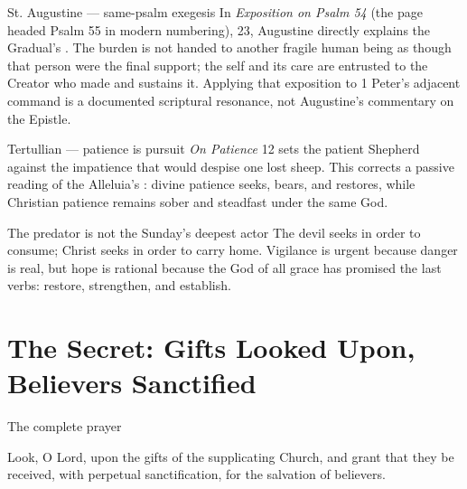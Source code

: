 \begin{deepstudy}
\begin{sourcecard}{St. Augustine --- same-psalm exegesis}
In \emph{Exposition on Psalm 54} (the page headed Psalm 55 in modern numbering), 23, Augustine directly explains the Gradual's . The burden is not handed to another fragile human being as though that person were the final support; the self and its care are entrusted to the Creator who made and sustains it. Applying that exposition to 1 Peter's adjacent command is a documented scriptural resonance, not Augustine's commentary on the Epistle.
\end{sourcecard}

\begin{sourcecard}{Tertullian --- patience is pursuit}
\emph{On Patience} 12 sets the patient Shepherd against the impatience that would despise one lost sheep. This corrects a passive reading of the Alleluia's : divine patience seeks, bears, and restores, while Christian patience remains sober and steadfast under the same God.
\end{sourcecard}

\begin{massbox}{The predator is not the Sunday's deepest actor}
The devil seeks in order to consume; Christ seeks in order to carry home. Vigilance is urgent because danger is real, but hope is rational because the God of all grace has promised the last verbs: restore, strengthen, and establish.
\end{massbox}

\sectionguard
\section*{The Secret: Gifts Looked Upon, Believers Sanctified}

\begin{studybox}{The complete prayer}

Look, O Lord, upon the gifts of the supplicating Church, and grant that they be received, with perpetual sanctification, for the salvation of believers.
\end{studybox}


\end{deepstudy}
